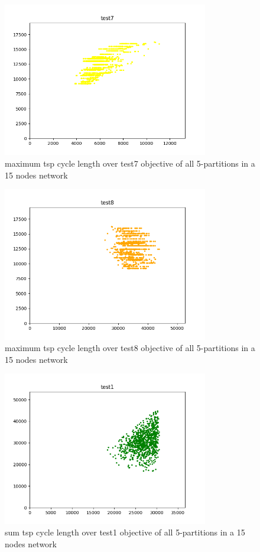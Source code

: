 \begin{figure}[h!]
\centering
\includegraphics[width=0.8\textwidth]{assets/test7max.png}
\caption{maximum tsp cycle length over test7 objective of all 5-partitions in a 15 nodes network}
\label{fig:test7max}
\end{figure}

\begin{figure}[h!]
\centering
\includegraphics[width=0.8\textwidth]{assets/test8max.png}
\caption{maximum tsp cycle length over test8 objective of all 5-partitions in a 15 nodes network}
\label{fig:test8max}
\end{figure}



\begin{figure}[h!]
\centering
\includegraphics[width=0.8\textwidth]{assets/test1sum.png}
\caption{sum tsp cycle length over test1 objective of all 5-partitions in a 15 nodes network}
\label{fig:test1sum}
\end{figure}

